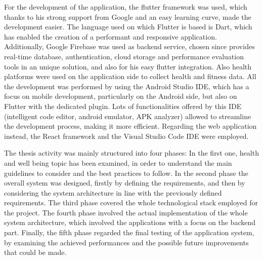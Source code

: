 \noindent For the development of the application, the flutter framework was used, which thanks to his strong support from Google and an easy learning curve, made the development easier. The language used on which Flutter is based is Dart, which has enabled the creation of a performant and responsive application. Additionally, Google Firebase was used as backend service, chosen since provides real-time database, authentication, cloud storage and performance evaluation tools in an unique solution, and also for his easy flutter integration. Also health platforms were used on the application side to collect health and fitness data. All the development was performed by using the Android Studio IDE, which has a focus on mobile development, particularly on the Android side, but also on Flutter with the dedicated plugin. Lots of functionalities offered by this IDE (intelligent code editor, android emulator, APK analyzer) allowed to streamline the development process, making it more efficient. Regarding the web application instead, the React framework and the Visual Studio Code IDE were employed.
\vspace{2ex}

\noindent The thesis activity was mainly structured into four phases: In the first one, health and well being topic has been examined, in order to understand the main guidelines to consider and the best practices to follow. In the second phase the overall system was designed, firstly by defining the requirements, and then by considering the system architecture in line with the previously defined requirements. The third phase covered the whole technological stack employed for the project. The fourth phase involved the actual implementation of the whole system architecture, which involved the applications with a focus on the backend part. Finally, the fifth phase regarded the final testing of the application system, by examining the achieved performances and the possible future improvements that could be made.
